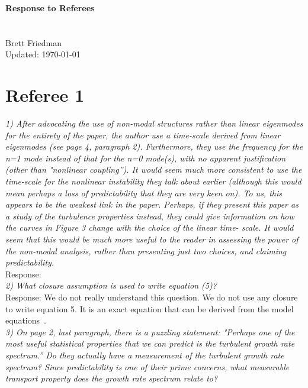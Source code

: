 \documentclass[12pt]{article}
\begin{document}
{\bf Response to Referees \\
 \\
 \\} 
Brett Friedman \\
Updated: \today \\

\hrulefill

\section{Referee 1}

\emph{1) After advocating the use of non-modal structures rather than linear eigenmodes for the
entirety of the paper, the author use a time-scale derived from linear eigenmodes (see
page 4, paragraph 2). Furthermore, they use the frequency for the n=1 mode instead of
that for the n=0 mode(s), with no apparent justification (other than "nonlinear coupling”).
It would seem much more consistent to use the time-scale for the nonlinear instability
they talk about earlier (although this would mean perhaps a loss of predictability that they
are very keen on). To us, this appears to be the weakest link in the paper. Perhaps, if they
present this paper as a study of the turbulence properties instead, they could give
information on how the curves in Figure 3 change with the choice of the linear time-
scale. It would seem that this would be much more useful to the reader in assessing the
power of the non-modal analysis, rather than presenting just two choices, and claiming
predictability. } \\

Response: \\


\emph{2) What closure assumption is used to write equation (5)?} \\


Response: We do not really understand this question. We do not use any closure to write equation 5. It is an exact equation that can be derived from the model equations~\cite{friedman2012b,friedman2013}. \\


\emph{3) On page 2, last paragraph, there is a puzzling statement: "Perhaps one of the most
useful statistical properties that we can predict is the turbulent growth rate spectrum.” Do
they actually have a measurement of the turbulent growth rate spectrum? Since
predictability is one of their prime concerns, what measurable transport property does the
growth rate spectrum relate to?}
\end{document}

